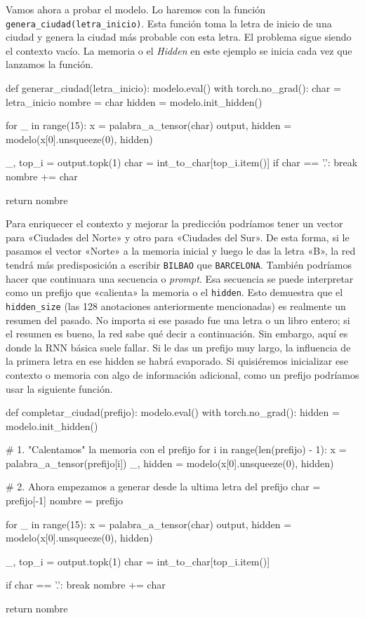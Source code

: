 \documentclass[a4paper,11pt]{article}
\begin{document}
Vamos ahora a probar el modelo. Lo haremos con la función
\texttt{genera\_ciudad(letra\_inicio)}. Esta función toma la letra de
inicio de una ciudad y genera la ciudad más probable con esta letra. El
problema sigue siendo el contexto vacío. La memoria o el \emph{Hidden}
en este ejemplo se inicia cada vez que lanzamos la función.

\begin{codigo}
def generar_ciudad(letra_inicio):
    modelo.eval()
    with torch.no_grad():
        char = letra_inicio
        nombre = char
        hidden = modelo.init_hidden()

        for _ in range(15):
            x = palabra_a_tensor(char)
            output, hidden = modelo(x[0].unsqueeze(0), hidden)
            
            _, top_i = output.topk(1)
            char = int_to_char[top_i.item()]
            if char == '.': 
                break
            nombre += char

    return nombre
\end{codigo}

Para enriquecer el contexto y mejorar la predicción podríamos tener un
vector para «Ciudades del Norte» y otro para «Ciudades del Sur». De esta
forma, si le pasamos el vector «Norte» a la memoria inicial y luego le
das la letra «B», la red tendrá más predisposición a escribir
\texttt{BILBAO} que \texttt{BARCELONA}. También podríamos hacer que
continuara una secuencia o \emph{prompt}. Esa secuencia se puede
interpretar como un prefijo que «calienta» la memoria o el
\texttt{hidden}. Esto demuestra que el \texttt{hidden\_size} (las 128
anotaciones anteriormente mencionadas) es realmente un resumen del
pasado. No importa si ese pasado fue una letra o un libro entero; si el
resumen es bueno, la red sabe qué decir a continuación. Sin embargo,
aquí es donde la RNN básica suele fallar. Si le das un prefijo muy
largo, la influencia de la primera letra en ese hidden se habrá
evaporado. Si quisiéremos inicializar ese contexto o memoria con algo de
información adicional, como un prefijo podríamos usar la siguiente
función.

\begin{codigo}
def completar_ciudad(prefijo):
    modelo.eval()
    with torch.no_grad():
        hidden = modelo.init_hidden()
        
        # 1. "Calentamos" la memoria con el prefijo
        for i in range(len(prefijo) - 1):
            x = palabra_a_tensor(prefijo[i])
            _, hidden = modelo(x[0].unsqueeze(0), hidden)
        
        # 2. Ahora empezamos a generar desde la ultima letra del prefijo
        char = prefijo[-1]
        nombre = prefijo
        
        for _ in range(15):
            x = palabra_a_tensor(char)
            output, hidden = modelo(x[0].unsqueeze(0), hidden)
            
            _, top_i = output.topk(1)
            char = int_to_char[top_i.item()]
            
            if char == '.': 
                break
            nombre += char
            
    return nombre
\end{codigo}
\end{document}
